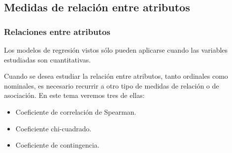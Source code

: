 \subsection{Medidas de relación entre atributos}
\begin{frame}
\frametitle{Relaciones entre atributos}
Los modelos de regresión vistos sólo pueden aplicarse cuando las variables estudiadas son cuantitativas.

Cuando se desea estudiar la relación entre atributos, tanto ordinales como nominales, es necesario recurrir a otro tipo
de medidas de relación o de asociación. En este tema veremos tres de ellas:
\begin{itemize}
\item Coeficiente de correlación de Spearman.
\item Coeficiente chi-cuadrado.
\item Coeficiente de contingencia.
\end{itemize}

\end{frame}


